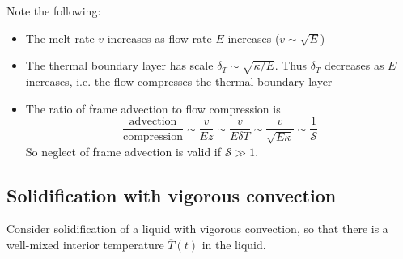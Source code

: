 \documentclass{jknotes}
\begin{document}
Note the following:
\begin{itemize}
	\item The melt rate $v$ increases as flow rate $E$ increases ($v \sim
		\sqrt{E}$)
	\item The thermal boundary layer has scale $\delta_T \sim \sqrt{\kappa/E}$.
		Thus $\delta_T$ decreases as $E$ increases, i.e. the flow compresses
		the thermal boundary layer
	\item The ratio of frame advection to flow compression is
		\begin{equation}
			\frac{\text{advection}}{\text{compression}} \sim \frac{v}{Ez} \sim
			\frac{v}{E\delta T} \sim \frac{v}{\sqrt{E\kappa}} \sim
			\frac{1}{\mathcal{S}}
		\end{equation}
		So neglect of frame advection is valid if $\mathcal{S} \gg 1$.
\end{itemize}

\subsection{Solidification with vigorous convection}
Consider solidification of a liquid with vigorous convection, so that there is
a well-mixed interior temperature $\overline{T}(t)$ in the liquid.
\begin{center}
\end{center}
\end{document}
